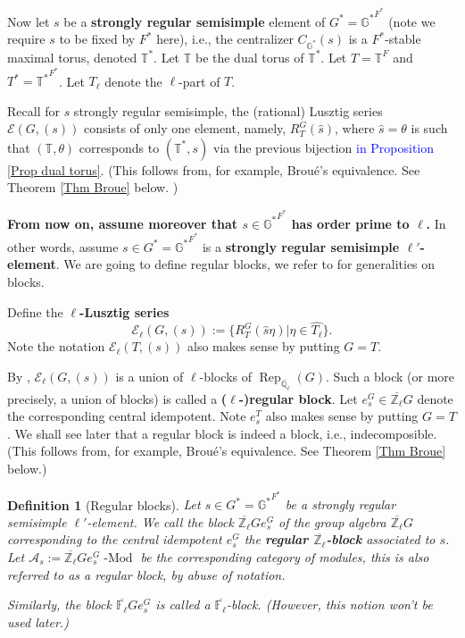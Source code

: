 \documentclass{article}
\newcommand{\red}[1]{\textcolor{red}{#1}}
\newcommand{\blue}[1]{\textcolor{blue}{#1}}
\newtheorem{definition}{Definition}
\newcommand{\Rep}{\operatorname{Rep}}
\newcommand{\Modl}{\operatorname{-Mod}}
\begin{document}
	Now let $s$ be a \textbf{strongly regular semisimple} 
	element of $G^*={\mathbb{G}^*}^{F^*}$ (note we require $s$ to be fixed by $F^*$ here), i.e., the centralizer $C_{\mathbb{G}^*}(s)$ is a $F^*$-stable maximal torus, denoted $\mathbb{T}^*$. Let $\mathbb{T}$ be the dual torus of $\mathbb{T}^*$. Let $T=\mathbb{T}^F$ and $T^*={\mathbb{T}^*}^{F^*}$. Let $T_\ell$ denote the $\ell$-part of $T$.
	
	Recall for $s$ strongly regular semisimple, the (rational) Lusztig series $\mathcal{E}(G, (s))$ consists of only one element, namely, $R_T^G(\hat{s})$, where $\hat{s}=\theta$ is such that $(\mathbb{T}, \theta)$ corresponds to $(\mathbb{T}^*, s)$ via the previous bijection \blue{in Proposition \ref{Prop dual torus}}. (This follows from, for example, Broué's equivalence. See Theorem \ref{Thm Broue} below.
	)
	
	\textbf{From now on, assume moreover that $s \in {\mathbb{G}^*}^{F^*}$ has order prime to $\ell$.} In other words, assume $s \in G^*={\mathbb{G}^*}^{F^*}$ is a \textbf{strongly regular semisimple $\ell'$-element}. We are going to define regular blocks, we refer to \cite[Appendix B]{bonnafe2010representations} for generalities on blocks.
	
	Define the \textbf{$\ell$-Lusztig series} 
	$$\mathcal{E}_\ell(G, (s)):=\{R_T^G(\hat{s}\eta)| \eta \in \widehat{T_\ell}\}.$$ Note the notation $\mathcal{E}_\ell(T, (s))$ also makes sense by putting $G=T$.
	
	By \cite{michel1989bloc}, $\mathcal{E}_\ell(G, (s))$ is a union of $\ell$-blocks of $\Rep_{\overline{\mathbb{Q}_\ell}}(G)$. Such a block (or more precisely, a union of blocks) is called a \textbf{($\ell$-)regular block}. Let $e_s^G \in \overline{\mathbb{Z}_\ell}G$ denote the corresponding central idempotent. Note $e_s^T$ also makes sense by putting $G=T$. We shall see later that a regular block is indeed a block, i.e., indecomposible. (This follows from, for example, Broué's equivalence. See Theorem \ref{Thm Broue} below.)
	
	\begin{definition}[Regular blocks]\label{Def Regular Block}
		Let $s \in G^*={\mathbb{G}^*}^{F^*}$ be a strongly regular semisimple $\ell'$-element.
		We call the block $\overline{\mathbb{Z}_\ell}Ge_s^G$ of the group algebra $\overline{\mathbb{Z}_\ell}G$ corresponding to the central idempotent $e_s^G$ the \textbf{regular $\overline{\mathbb{Z}_\ell}$-block} associated to $s$. Let $\mathcal{A}_s:=\overline{\mathbb{Z}_\ell}Ge_s^G\Modl$ be the corresponding category of modules, this is also referred to as a regular block, by abuse of notation.
		
		Similarly, the block $\overline{\mathbb{F}_\ell}Ge_s^G$ is called a $\overline{\mathbb{F}_{\ell}}$-block. (However, this notion won't be used later.)
	\end{definition}
	
\end{document}
